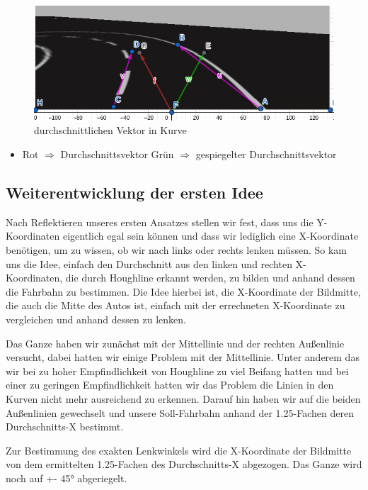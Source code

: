 \begin{figure}[H]
	\centering	
	\includegraphics[width=.5\textwidth]{img/vector_kurve}
	\caption[durchschnittlicher Vektor in Kurve]{durchschnittlichen Vektor in Kurve}
	\label{fig:vector_kurve}
\end{figure}

\begin{itemize}
			\item \color{red} Rot $\Rightarrow$ Durchschnittsvektor 	\qquad \color{green} Grün $\Rightarrow$ gespiegelter Durchschnittsvektor
			
\end{itemize}



\subsection{Weiterentwicklung der ersten Idee}
Nach Reflektieren unseres ersten Ansatzes stellen wir fest, dass uns die Y-Koordinaten eigentlich egal sein können und dass wir lediglich eine X-Koordinate benötigen, um zu wissen, ob wir nach links oder rechts lenken müssen. So kam uns die Idee, einfach den Durchschnitt aus den linken und rechten X-Koordinaten, die durch Houghline erkannt werden, zu bilden und anhand dessen die Fahrbahn zu bestimmen. Die Idee hierbei ist, die X-Koordinate der Bildmitte, die auch die Mitte des Autos ist, einfach mit der errechneten X-Koordinate zu vergleichen und anhand dessen zu lenken.

Das Ganze haben wir zunächst mit der Mittellinie und der rechten Außenlinie versucht, dabei hatten wir einige Problem mit der Mittellinie. Unter anderem das wir bei zu hoher Empfindlichkeit von Houghline zu viel Beifang hatten und bei einer zu geringen Empfindlichkeit hatten wir das Problem die Linien in den Kurven nicht mehr ausreichend zu erkennen. Darauf hin haben wir auf die beiden Außenlinien gewechselt und unsere Soll-Fahrbahn anhand der 1.25-Fachen deren Durchschnitts-X bestimmt.

Zur Bestimmung des exakten Lenkwinkels wird die X-Koordinate der Bildmitte von dem ermittelten 1.25-Fachen des Durchschnitts-X abgezogen. Das Ganze wird noch auf +- 45° abgeriegelt.

